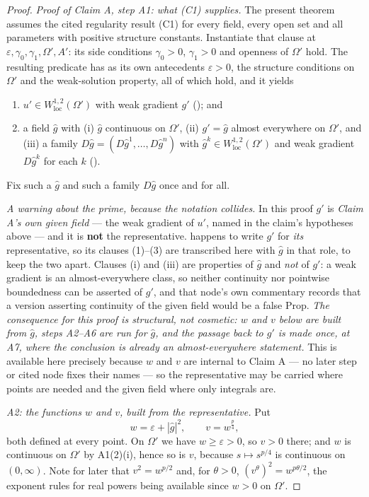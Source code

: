 \begin{proof}
\emph{Proof of Claim A, step A1: what (C1) supplies.}  The present theorem
assumes the cited regularity result (C1) for every field, every open set and all
parameters with positive structure constants.  Instantiate that clause at
$\varepsilon,\gamma_0,\gamma_1,\Omega',A'$: its side conditions
$\gamma_0>0$, $\gamma_1>0$ and openness of $\Omega'$ hold.  The resulting
predicate  has as its own antecedents
$\varepsilon>0$, the structure conditions on $\Omega'$ and the weak-solution
property, all of which hold, and it yields
\begin{enumerate}
\item $u'\in W^{1,2}_{\mathrm{loc}}(\Omega')$ with weak gradient $g'$
  (); and
\item a field $\hat g$ with (i) $\hat g$ continuous on $\Omega'$, (ii)
  $g'=\hat g$ almost everywhere on $\Omega'$, and (iii) a family
  $D\hat g=(D\hat g^1,\dots,D\hat g^n)$ with
  $\hat g^k\in W^{1,2}_{\mathrm{loc}}(\Omega')$ and weak gradient $D\hat g^k$
  for each $k$ ().
\end{enumerate}
Fix such a $\hat g$ and such a family $D\hat g$ once and for all.

\emph{A warning about the prime, because the notation collides.}  In this proof
$g'$ is \emph{Claim A's own given field} --- the weak gradient of $u'$, named in
the claim's hypotheses above --- and it is \textbf{not} the representative.
 happens to write $g'$ for \emph{its}
representative, so its clauses (1)--(3) are transcribed here with $\hat g$ in
that role, to keep the two apart.  Clauses (i) and (iii) are properties of
$\hat g$ and \emph{not} of $g'$: a weak gradient is an almost-everywhere class,
so neither continuity nor pointwise boundedness can be asserted of $g'$, and
that node's own commentary records that a version asserting continuity of the
given field would be a false $\mathrm{Prop}$.  \emph{The consequence for this
proof is structural, not cosmetic: $w$ and $v$ below are built from $\hat g$,
steps A2--A6 are run for $\hat g$, and the passage back to $g'$ is made once, at
A7, where the conclusion is already an almost-everywhere statement.}  This is
available here precisely because $w$ and $v$ are internal to Claim A --- no
later step or cited node fixes their names --- so the representative may be
carried where points are needed and the given field where only integrals are.

\emph{A2: the functions $w$ and $v$, built from the representative.}  Put
\[
w=\varepsilon+|\hat g|^2,\qquad v=w^{\frac p4},
\]
both defined at every point.  On $\Omega'$ we have $w\ge\varepsilon>0$, so
$v>0$ there; and $w$ is continuous on $\Omega'$ by A1(2)(i), hence so is $v$,
because $s\mapsto s^{p/4}$ is continuous on $(0,\infty)$.  Note for later that
$v^2=w^{p/2}$ and, for $\theta>0$, $(v^\theta)^2=w^{p\theta/2}$, the exponent
rules for real powers being available since $w>0$ on $\Omega'$.


\end{proof}
